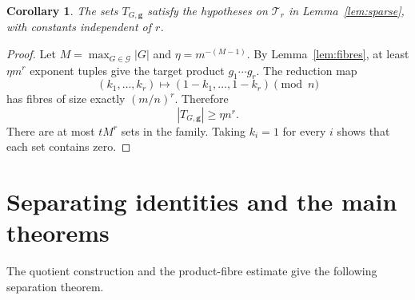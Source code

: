 \documentclass[10pt,a4paper]{amsart}
\newtheorem{corollary}[theorem]{Corollary}
\numberwithin{equation}{section}
\newcommand{\calG}{\mathcal{G}}
\renewcommand{\geq}{\geqslant}
\begin{document}
\begin{corollary}\label{cor:dense}
The sets $T_{G,\boldsymbol{g}}$ satisfy the hypotheses on $\mathcal{T}_r$ in Lemma~\ref{lem:sparse}, with constants independent of $r$.
\end{corollary}
\begin{proof}
Let $M=\max_{G\in\calG}|G|$ and $\eta=m^{-(M-1)}$. By Lemma~\ref{lem:fibres}, at least $\eta m^r$ exponent tuples give the target product $g_1\cdots g_r$. The reduction map
\[
 (k_1,\ldots,k_r)\longmapsto(1-k_1,\ldots,1-k_r)\pmod n
\]
has fibres of size exactly $(m/n)^r$. Therefore
\[
 |T_{G,\boldsymbol{g}}|\geq\eta n^r.
\]
There are at most $tM^r$ sets in the family. Taking $k_i=1$ for every $i$ shows that each set contains zero.
\end{proof}

\section{Separating identities and the main theorems}\label{sec:separation}
The quotient construction and the product-fibre estimate give the following separation theorem.
\end{document}
